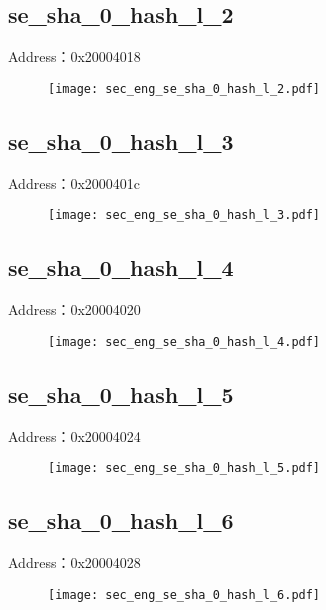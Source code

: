 \subsection{se\_sha\_0\_hash\_l\_2}
\label{sec_eng-se-sha-0-hash-l-2}
Address：0x20004018
 \begin{figure}[H]
\texttt{[image: sec\_eng\_se\_sha\_0\_hash\_l\_2.pdf]}
\end{figure}

\subsection{se\_sha\_0\_hash\_l\_3}
\label{sec_eng-se-sha-0-hash-l-3}
Address：0x2000401c
 \begin{figure}[H]
\texttt{[image: sec\_eng\_se\_sha\_0\_hash\_l\_3.pdf]}
\end{figure}

\subsection{se\_sha\_0\_hash\_l\_4}
\label{sec_eng-se-sha-0-hash-l-4}
Address：0x20004020
 \begin{figure}[H]
\texttt{[image: sec\_eng\_se\_sha\_0\_hash\_l\_4.pdf]}
\end{figure}

\subsection{se\_sha\_0\_hash\_l\_5}
\label{sec_eng-se-sha-0-hash-l-5}
Address：0x20004024
 \begin{figure}[H]
\texttt{[image: sec\_eng\_se\_sha\_0\_hash\_l\_5.pdf]}
\end{figure}

\subsection{se\_sha\_0\_hash\_l\_6}
\label{sec_eng-se-sha-0-hash-l-6}
Address：0x20004028
 \begin{figure}[H]
\texttt{[image: sec\_eng\_se\_sha\_0\_hash\_l\_6.pdf]}
\end{figure}

